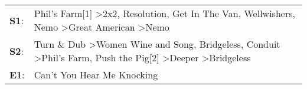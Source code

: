 \begin{supertabular}{p{0.03\textwidth}p{0.92\textwidth}}
 \textbf{S1}:  &                             Phil's Farm[1]\textsuperscript{} \textgreater \enspace 2x2\textsuperscript{}, \enspace Resolution\textsuperscript{}, \enspace Get In The Van\textsuperscript{}, \enspace Wellwishers\textsuperscript{}, \enspace Nemo\textsuperscript{} \textgreater \enspace Great American\textsuperscript{} \textgreater \enspace Nemo\textsuperscript{}  \enspace  \\
 \textbf{S2}:  &  Turn \& Dub\textsuperscript{} \textgreater \enspace Women Wine and Song\textsuperscript{}, \enspace Bridgeless\textsuperscript{}, \enspace Conduit\textsuperscript{} \textgreater \enspace Phil's Farm\textsuperscript{}, \enspace Push the Pig[2]\textsuperscript{} \textgreater \enspace Deeper\textsuperscript{} \textgreater \enspace Bridgeless\textsuperscript{}  \enspace  \\
 \textbf{E1}:  &                                                                                                                                                                                                                                                                                                                            Can't You Hear Me Knocking\textsuperscript{}  \enspace  \\
\end{supertabular}
